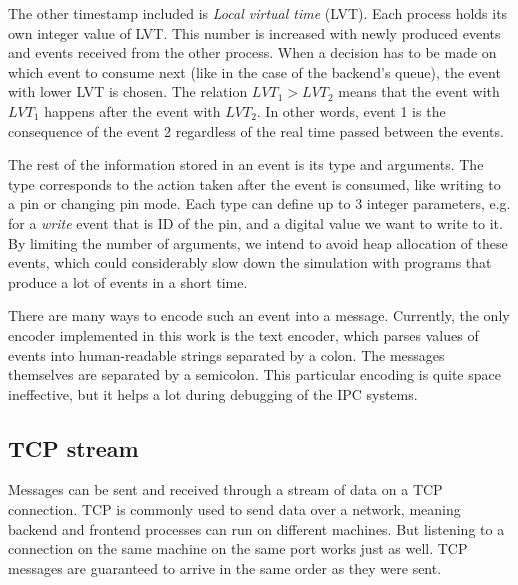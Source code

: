 The other timestamp included is \textit{Local virtual time} (LVT)\footnotemark. Each process holds its own integer value of LVT. This number is increased with newly produced events and events received from the other process. When a decision has to be made on which event to consume next (like in the case of the backend's queue), the event with lower LVT is chosen. The relation $LVT_{1} > LVT_{2}$ means that the event with $LVT_{1}$ happens after the event with $LVT_{2}$. In other words, event 1 is the consequence of the event 2 regardless of the real time passed between the events.

The rest of the information stored in an event is its type and arguments. The type corresponds to the action taken after the event is consumed, like writing to a pin or changing pin mode. Each type can define up to 3 integer parameters, e.g. for a \textit{write} event that is ID of the pin, and a digital value we want to write to it. By limiting the number of arguments, we intend to avoid heap allocation of these events, which could considerably slow down the simulation with programs that produce a lot of events in a short time.

There are many ways to encode such an event into a message. Currently, the only encoder implemented in this work is the text encoder, which parses values of events into human-readable strings separated by a colon. The messages themselves are separated by a semicolon. This particular encoding is quite space ineffective, but it helps a lot during debugging of the IPC systems.


\subsection{TCP stream} \label{subsec:ipc_tcp}

Messages can be sent and received through a stream of data on a TCP connection. TCP is commonly used to send data over a network, meaning backend and frontend processes can run on different machines. But listening to a connection on the same machine on the same port works just as well. TCP messages are guaranteed to arrive in the same order as they were sent.

